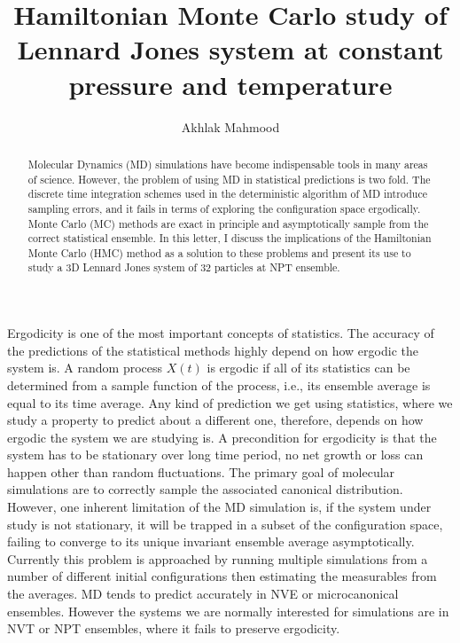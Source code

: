 \documentclass[aps,prl,reprint]{revtex4-1}
\begin{document}
\title{Hamiltonian Monte Carlo study of Lennard Jones system at constant pressure and temperature}
\author{Akhlak Mahmood}

\begin{abstract}
Molecular Dynamics (MD) simulations have become indispensable tools in many areas of science. However, the problem of using MD in statistical predictions is two fold. The discrete time integration schemes used in the deterministic algorithm of MD introduce sampling errors, and it fails in terms of exploring the configuration space ergodically. Monte Carlo (MC) methods are exact in principle and asymptotically sample from the correct statistical ensemble. In this letter, I discuss the implications of the Hamiltonian Monte Carlo (HMC) method as a solution to these problems and present its use to study a 3D Lennard Jones system of 32 particles at NPT ensemble.
\end{abstract}

\maketitle

Ergodicity is one of the most important concepts of statistics. The accuracy of the predictions of the statistical methods highly depend on how ergodic the system is. A random process $X(t)$ is ergodic if all of its statistics can be determined from a sample function of the process, i.e., its ensemble average is equal to its time average. Any kind of prediction we get using statistics, where we study a property to predict about a different one, therefore, depends on how ergodic the system we are studying is. A precondition for ergodicity is that the system has to be stationary over long time period, no net growth or loss can happen other than random fluctuations. 
The primary goal of molecular simulations are to correctly sample the associated canonical distribution. However, one inherent limitation of the MD simulation is, if the system under study is not stationary, it will be trapped in a subset of the configuration space, failing to converge to its unique invariant ensemble average asymptotically. \cite{Neal2012} Currently this problem is approached by running multiple simulations from a number of different initial configurations then estimating the measurables from the averages. \cite{Calvo2002} MD tends to predict accurately in NVE or microcanonical ensembles. However the systems we are normally interested for simulations are in NVT or NPT ensembles, where it fails to preserve ergodicity.
\end{document}
